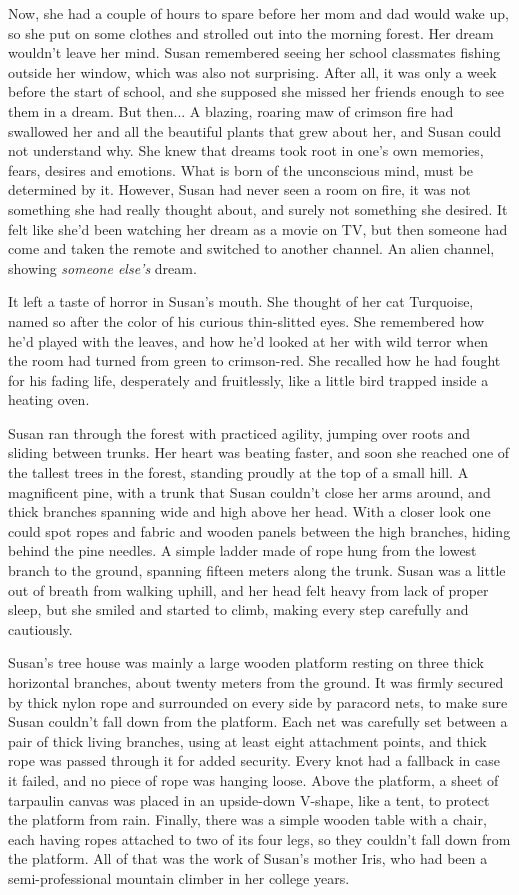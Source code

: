 \documentclass[openany, oneside]{book}
\begin{document}
Now, she had a couple of hours to spare before her mom and dad would wake up, so she put on some clothes and strolled out into the morning forest.
Her dream wouldn't leave her mind. 
Susan remembered seeing her school classmates fishing outside her window, which was also not surprising.
After all, it was only a week before the start of school, and she supposed she missed her friends enough to see them in a dream. 
But then...
A blazing, roaring maw of crimson fire had swallowed her and all the beautiful plants that grew about her, and Susan could not understand why.
She knew that dreams took root in one's own memories, fears, desires and emotions.
What is born of the unconscious mind, must be determined by it.
However, Susan had never seen a room on fire, it was not something she had really thought about, and surely not something she desired.
It felt like she'd been watching her dream as a movie on TV, but then someone had come and taken the remote and switched to another channel.
An alien channel, showing \emph{someone else's} dream.

It left a taste of horror in Susan's mouth.
She thought of her cat Turquoise, named so after the color of his curious thin-slitted eyes.
She remembered how he'd played with the leaves, and how he'd looked at her with wild terror when the room had turned from green to crimson-red.
She recalled how he had fought for his fading life, desperately and fruitlessly, like a little bird trapped inside a heating oven.

Susan ran through the forest with practiced agility, jumping over roots and sliding between trunks.
Her heart was beating faster, and soon she reached one of the tallest trees in the forest, standing proudly at the top of a small hill.
A magnificent pine, with a trunk that Susan couldn't close her arms around, and thick branches spanning wide and high above her head.
With a closer look one could spot ropes and fabric and wooden panels between the high branches, hiding behind the pine needles.
A simple ladder made of rope hung from the lowest branch to the ground, spanning fifteen meters along the trunk.
Susan was a little out of breath from walking uphill, and her head felt heavy from lack of proper sleep, but she smiled and started to climb, making every step carefully and cautiously.

Susan's tree house was mainly a large wooden platform resting on three thick horizontal branches, about twenty meters from the ground.
It was firmly secured by thick nylon rope and surrounded on every side by paracord nets, to make sure Susan couldn't fall down from the platform.
Each net was carefully set between a pair of thick living branches, using at least eight attachment points, and thick rope was passed through it for added security.
Every knot had a fallback in case it failed, and no piece of rope was hanging loose.
Above the platform, a sheet of tarpaulin canvas was placed in an upside-down V-shape, like a tent, to protect the platform from rain.
Finally, there was a simple wooden table with a chair, each having ropes attached to two of its four legs, so they couldn't fall down from the platform.
All of that was the work of Susan's mother Iris, who had been a semi-professional mountain climber in her college years.
\end{document}
